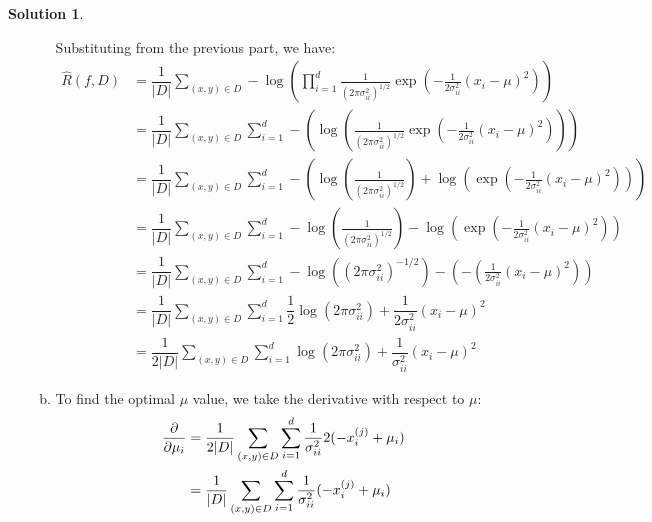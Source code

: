 \documentclass[letterpaper, 12pt]{article}
\theoremstyle{definition}
\newtheorem*{solution}{Solution}
\begin{document}
\begin{solution}
\begin{enumerate}[1.]
\begin{enumerate}[(a)]
                    Substituting from the previous part, we have:
                    \begin{equation*}
                    	\begin{split}
                        	\hat{R}(f, D) & = \dfrac{1}{|D|} \sum_{(x, y) \in D} -\log (\prod_{i=1}^{d} \frac{1}{(2\pi \sigma_{ii}^2)^{1/2} } \exp (-\frac{1}{2 \sigma_{ii}^2}(x_i - \mu)^2) ) \\
                            & = \dfrac{1}{|D|} \sum_{(x, y) \in D} \sum_{i=1}^{d}  -\left(\log (\frac{1}{(2\pi \sigma_{ii}^2)^{1/2} } \exp (-\frac{1}{2 \sigma_{ii}^2}(x_i - \mu)^2) )\right) \\
                            & = \dfrac{1}{|D|} \sum_{(x, y) \in D} \sum_{i=1}^{d}  -\left(\log (\frac{1}{(2\pi \sigma_{ii}^2)^{1/2} }) + \log(\exp( -\frac{1}{2 \sigma_{ii}^2}(x_i - \mu)^2 )) \right) \\
                            & = \dfrac{1}{|D|} \sum_{(x, y) \in D} \sum_{i=1}^{d} -\log (\frac{1}{(2\pi\sigma_{ii}^{2})^{1/2}}) - \log(\exp( -\frac{1}{2 \sigma_{ii}^2}(x_i - \mu)^2 )) \\
                            & = \dfrac{1}{|D|} \sum_{(x, y) \in D} \sum_{i=1}^{d} -\log ( (2\pi\sigma_{ii}^{2})^{-1/2} ) - \left( -\left(\frac{1}{2 \sigma_{ii}^2}(x_i - \mu)^2\right) \right) \\
                            & = \dfrac{1}{|D|} \sum_{(x, y) \in D} \sum_{i=1}^{d} \dfrac{1}{2} \log ( 2\pi\sigma_{ii}^{2} ) + \dfrac{1}{2\sigma_{ii}^{2}} (x_{i} - \mu)^{2} \\
                            & = \dfrac{1}{2|D|} \sum_{(x, y) \in D} \sum_{i=1}^{d} \log( 2\pi\sigma_{ii}^{2}) + \dfrac{1}{\sigma_{ii}^{2}}(x_{i}-\mu)^{2}
                        \end{split}
                    \end{equation*}
                 
            	\item To find the optimal $\mu$ value, we take the derivative with respect to $\mu$:
				\begin{equation*}
				\begin{split}
				\pdv{}{\mu_{i}} &= \dfrac{1}{2|D|} \sum_{(x,y) \in D} \sum_{i = 1}^{d} \frac{1}{ \sigma_{ii}^2}2(- x_{i}^{(j)} + \mu_{i})   \\
				&=\dfrac{1}{|D|} \sum_{(x,y) \in D}  \sum_{i = 1}^{d} \frac{1}{\sigma_{ii} ^2}
						(- x_{i}^{(j)} + \mu_{i})  \\
				\end{split}
				\end{equation*}


\end{enumerate}
\end{enumerate}
\end{solution}
\end{document}
